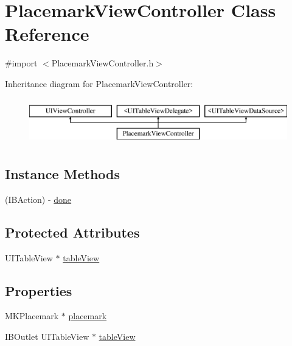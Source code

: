 \hypertarget{interface_placemark_view_controller}{\section{Placemark\-View\-Controller Class Reference}
\label{interface_placemark_view_controller}
}


{\ttfamily \#import $<$Placemark\-View\-Controller.\-h$>$}

Inheritance diagram for Placemark\-View\-Controller\-:\begin{figure}[H]
\begin{center}
\leavevmode
\includegraphics[height=2.000000cm]{interface_placemark_view_controller}
\end{center}
\end{figure}
\subsection*{Instance Methods}
\begin{DoxyCompactItemize}
\item 
(I\-B\-Action) -\/ \hyperlink{interface_placemark_view_controller_a545e2ce893f90ae5c47a50c99557ec33}{done}
\end{DoxyCompactItemize}
\subsection*{Protected Attributes}
\begin{DoxyCompactItemize}
\item 
U\-I\-Table\-View $\ast$ \hyperlink{interface_placemark_view_controller_a36834ba2647608541c2f1a4a85be87bb}{table\-View}
\end{DoxyCompactItemize}
\subsection*{Properties}
\begin{DoxyCompactItemize}
\item 
M\-K\-Placemark $\ast$ \hyperlink{interface_placemark_view_controller_a878263909b0235ddccd1ad6171fc2325}{placemark}
\item 
I\-B\-Outlet U\-I\-Table\-View $\ast$ \hyperlink{interface_placemark_view_controller_a0eda8ceb83861639e0ee31b816a175c4}{table\-View}
\end{DoxyCompactItemize}


